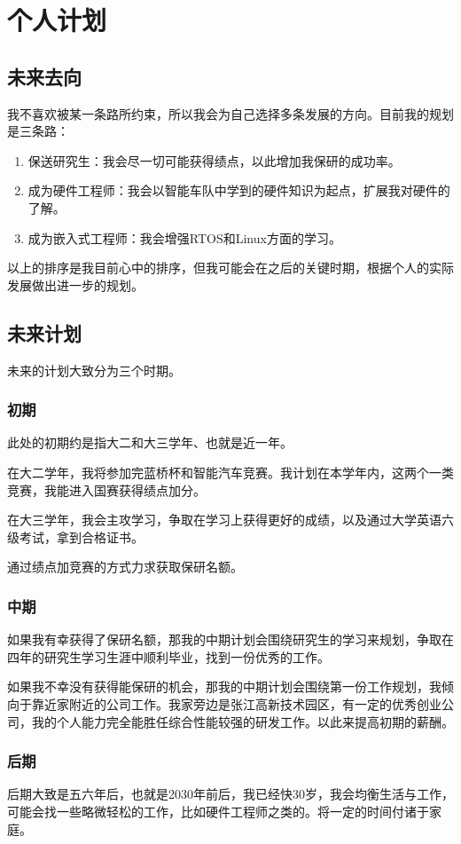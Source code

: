 \documentclass{ctexart}
\begin{document}
	\newpage
	
	\section{个人计划}
		\subsection{未来去向}
			我不喜欢被某一条路所约束，所以我会为自己选择多条发展的方向。目前我的规划是三条路：\par
			\begin{enumerate}
				\item 保送研究生：我会尽一切可能获得绩点，以此增加我保研的成功率。
				\item 成为硬件工程师：我会以智能车队中学到的硬件知识为起点，扩展我对硬件的了解。
				\item 成为嵌入式工程师：我会增强RTOS和Linux方面的学习。
			\end{enumerate}\par
			以上的排序是我目前心中的排序，但我可能会在之后的关键时期，根据个人的实际发展做出进一步的规划。
		\subsection{未来计划}
			未来的计划大致分为三个时期。
			\subsubsection{初期}
				此处的初期约是指大二和大三学年、也就是近一年。\par
				在大二学年，我将参加完蓝桥杯和智能汽车竞赛。我计划在本学年内，这两个一类竞赛，我能进入国赛获得绩点加分。\par
				在大三学年，我会主攻学习，争取在学习上获得更好的成绩，以及通过大学英语六级考试，拿到合格证书。\par
				通过绩点加竞赛的方式力求获取保研名额。
			\subsubsection{中期}
				如果我有幸获得了保研名额，那我的中期计划会围绕研究生的学习来规划，争取在四年的研究生学习生涯中顺利毕业，找到一份优秀的工作。\par
				如果我不幸没有获得能保研的机会，那我的中期计划会围绕第一份工作规划，我倾向于靠近家附近的公司工作。我家旁边是张江高新技术园区，有一定的优秀创业公司，我的个人能力完全能胜任综合性能较强的研发工作。以此来提高初期的薪酬。
			\subsubsection{后期}
				后期大致是五六年后，也就是2030年前后，我已经快30岁，我会均衡生活与工作，可能会找一些略微轻松的工作，比如硬件工程师之类的。将一定的时间付诸于家庭。
		
\end{document}
